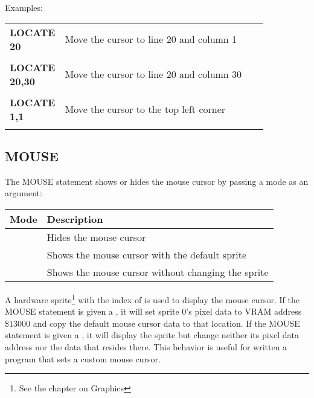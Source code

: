 Examples:

\begin{tabular}{l p{0.85\linewidth}}

	{\ttfamily\bfseries LOCATE 20} & Move the cursor to line 20 and column
	1\\\\

	{\ttfamily\bfseries LOCATE 20,30} & Move the cursor to line 20 and column
	30\\\\

	{\ttfamily\bfseries LOCATE 1,1} & Move the cursor to the top left corner\\\\

\end{tabular}

\vspace{16pt}

\subsection{MOUSE}

The {\ttfamily MOUSE} statement shows or hides the mouse cursor by passing a
mode as an argument:\\

\begin{tabular}{|c|l|}
	\hline
	
	{\bfseries Mode} & {\bfseries Description} \\ \hline
	{\ttfamily 0} & Hides the mouse cursor \\ \hline
	{\ttfamily 1} & Shows the mouse cursor with the default sprite \\ \hline
	{\ttfamily -1} & Shows the mouse cursor without changing the sprite\\ \hline

\end{tabular}

\vspace{16pt}

A hardware sprite\footnote{See the chapter on Graphics} with the index of
{} is used to display the mouse cursor.  If the {\ttfamily MOUSE}
statement is given a {}, it will set sprite 0's pixel data to VRAM
address {\ttfamily \$13000} and copy the default mouse cursor data to that
location.  If the {\ttfamily MOUSE} statement is given a {}, it
will display the sprite but change neither its pixel data address nor the data
that resides there.  This behavior is useful for written a program that sets a
custom mouse cursor.\\

